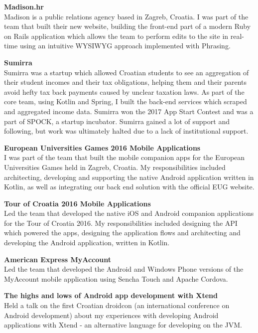 \documentclass[10pt, a4paper, final, onecolumn, oneside, notitlepage]{article}
\newcommand{\halfsectionspacing}[0]{ \vspace{4pt} }
\begin{document}
\begin{center}
\begin{flushleft}
\halfsectionspacing

\textbf{Madison.hr} \\
Madison is a public relations agency based in Zagreb, Croatia. I was part of the team that built their new website, building the front-end part of a modern Ruby on Rails application which allows the team to perform edits to the site in real-time using an intuitive WYSIWYG approach implemented with Phrasing.

\halfsectionspacing

\textbf{Sumirra} \\
Sumirra was a startup which allowed Croatian students to see an aggregation of their student incomes and their tax obligations, helping them and their parents avoid hefty tax back payments caused by unclear taxation laws. As part of the core team, using Kotlin and Spring, I built the back-end services which scraped and aggregated income data. Sumirra won the 2017 App Start Contest and was a part of SPOCK, a startup incubator. Sumirra gained a lot of support and following, but work was ultimately halted due to a lack of institutional support.

\halfsectionspacing

\textbf{European Universities Games 2016 Mobile Applications} \\
I was part of the team that built the mobile companion apps for the European Universities Games held in Zagreb, Croatia. My responsibilities included architecting, developing and supporting the native Android application written in Kotlin, as well as integrating our back end solution with the official EUG website.

\halfsectionspacing

\textbf{Tour of Croatia 2016 Mobile Applications} \\
Led the team that developed the native iOS and Android companion applications for the Tour of Croatia 2016. My responsibilities included designing the API which powered the apps, designing the application flows and architecting and developing the Android application, written in Kotlin.

\halfsectionspacing

\textbf{American Express MyAccount} \\
Led the team that developed the Android and Windows Phone versions of the MyAccount mobile application using Sencha Touch and Apache Cordova.

\halfsectionspacing

\textbf{The highs and lows of Android app development with Xtend} \\
Held a talk on the first Croatian droidcon (an international conference on Android development) about my experiences with developing Android applications with Xtend - an alternative language for developing on the JVM.


\end{flushleft}
\end{center}
\end{document}
